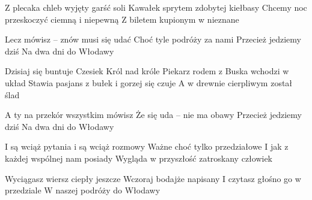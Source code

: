 \documentclass[../../../songbook.tex]{subfiles}
\begin{document}
\begin{multicols}{2}
{Z plecaka chleb wyjęty garść soli				\newline		
Kawałek sprytem zdobytej kiełbasy				\newline			
Chcemy noc przeskoczyć ciemną i niepewną				\newline	
Z biletem kupionym w nieznane					\newline	

\-\hspace{1cm} Lecz mówisz – znów musi się udać				\newline	
\-\hspace{1cm} Choć tyle podróży za nami 			\newline
\-\hspace{1cm} Przecież jedziemy dziś			\newline
\-\hspace{1cm} Na dwa dni do Włodawy 			\newline

Dzisiaj się buntuje Czesiek Król nad króle 			\newline
Piekarz rodem z Buska wchodzi w układ 			\newline
Stawia pasjans z bułek i gorzej się czuje 			\newline
A w drewnie cierpliwym został ślad 			\newline

\-\hspace{1cm} A ty na przekór wszystkim mówisz 			\newline
\-\hspace{1cm} Że się uda – nie ma obawy 			\newline
\-\hspace{1cm} Przecież jedziemy dziś			\newline
\-\hspace{1cm} Na dwa dni do Włodawy 			\newline

I są wciąż pytania i są wciąż rozmowy 			\newline
Ważne choć tylko przedziałowe 			\newline
I jak z każdej wspólnej nam posiady 			\newline
Wygląda w przyszłość zatroskany człowiek 			\newline

\-\hspace{1cm} Wyciągasz wiersz ciepły jeszcze 			\newline
\-\hspace{1cm} Wczoraj bodajże napisany 			\newline
\-\hspace{1cm} I czytasz głośno go w przedziale 			\newline
\-\hspace{1cm} W naszej podróży do Włodawy  			\newline

}
\end{multicols}
\end{document}
